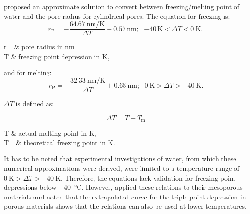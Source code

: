 \textcite{brun.1977} proposed an approximate solution to convert between freezing/melting point of water and the pore radius for cylindrical pores. %
The equation for freezing is:
\begin{equation}
	r_\text{P} = -\frac{\qty{64.67}{\nano\meter\per\kelvin}}{\Delta T }+\qty{0.57}{\nano\meter};~~~\qty{-40}{\kelvin} < \Delta T < \qty{0}{\kelvin},
	\label{eq:brun_freeze}
\end{equation}
\begin{conditions}
	r_ & pore radius in \unit{\nano\meter}\\
	\Delta T  &  freezing point depression in \unit{\kelvin},
\end{conditions}

and for melting:
\begin{equation}
	r_\text{P} = -\frac{\qty{32.33}{\nano\meter\per\kelvin}}{\Delta T }+\qty{0.68}{\nano\meter};~~~\qty{0}{\kelvin} > \Delta T > \qty{-40}{\kelvin}.
	\label{eq:brun_melt}
\end{equation}

$\Delta T$ is defined as:

\begin{equation}
	\Delta T = T - T_\text{m}
	\label{eq:brun_dT}
\end{equation}
\begin{conditions}
	T          &   actual melting point in \unit{\kelvin}, \\
	T_ &   theoretical freezing point in \unit{\kelvin}.
\end{conditions}

It has to be noted that \textcite{brun.1977} experimental investigations of water, from which these numerical approximations were derived, were limited to a temperature range of $\qty{0}{\kelvin} > \Delta T > \qty{-40}{\kelvin}$.
Therefore, the equations lack validation for freezing point depressions below \qty{-40}{\celsius}.
However, \textcite{kloetstra.1995} applied these relations to their mesoporous materials and noted that the extrapolated curve for the triple point depression in porous materials shows that the relations can also be used at lower temperatures.

